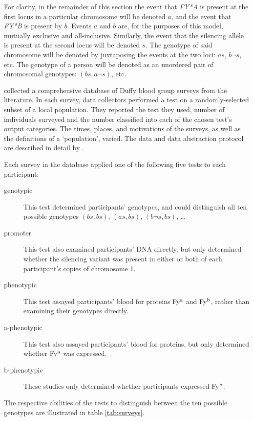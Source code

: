 \documentclass[article]{jss}
\begin{document}
For clarity, in the remainder of this section the event that \emph{FY*A} is present at the first locus in a particular chromosome will be denoted $a$, and the event that \emph{FY*B} is present by $b$. Events $a$ and $b$ are, for the purposes of this model, mutually exclusive and all-inclusive. Similarly, the event that the silencing allele is present at the second locus will be denoted $s$. The genotype of said chromosome will be denoted by juxtaposing the events at the two loci: $as$, $b\neg s$, etc. The genotype of a person will be denoted as an unordered pair of chromosomal genotypes: $(bs,a \neg s)$, etc.

\cite{Howes} collected a comprehensive database of Duffy blood group surveys from the literature. In each survey, data collectors performed a test on a randomly-selected subset of a local population. They reported the test they used, number of individuals surveyed and the number classified into each of the chosen test's output categories. The times, places, and motivations of the surveys, as well as the definitions of a `population', varied. The data and data abstraction protocol are described in detail by \cite{Howes}. 

Each survey in the database applied one of the following five tests to each participant:
\begin{description}
    \item[genotypic] This test determined participants' genotypes, and
could distinguish all ten possible genotypes $(bs,bs)$, $(as,bs)$, $(b\neg s,bs)$, \ldots
    \item[promoter] This test also examined participants' DNA directly, but only determined whether the silencing variant was present in either or both of each participant's copies of chromosome 1.
    \item[phenotypic] This test assayed participants' blood for proteins Fy$^\textup{a}$ and Fy$^\textup{b}$, rather than examining their genotypes directly.
    \item[a-phenotypic] This test also assayed participants' blood for proteins, but only determined whether Fy$^\textup{a}$ was expressed.
    \item[b-phenotypic] These studies only determined whether participants expressed Fy$^\textup{b}$.
\end{description}
The respective abilities of the tests to distinguish between the ten possible genotypes are illustrated in table \ref{tab:surveys}.
\end{document}
